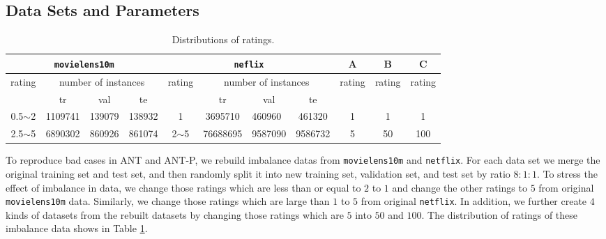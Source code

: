 \documentclass[11pt,twoside]{article}
\begin{document}
\subsection{Data Sets and Parameters}
\begin{table}[H]
\centering
\begin{tabular}{|c|c|l|c|c|c|l|c|c|c|c|}
\hline
\multicolumn{4}{|c|}{\tt movielens10m}                                    & \multicolumn{4}{c|}{\tt neflix}                                             & A                       & B                       & C                                            \\ \hline
\multirow{2}{*}{rating} & \multicolumn{3}{c|}{number of instances}    & \multirow{2}{*}{rating} & \multicolumn{3}{c|}{number of instances}      & \multirow{2}{*}{rating} & \multirow{2}{*}{rating} & \multicolumn{1}{l|}{\multirow{2}{*}{rating}} \\ \cline{2-4} \cline{6-8}
                        & tr      & \multicolumn{1}{c|}{val} & te     &                         & tr       & \multicolumn{1}{c|}{val} & te      &                         &                         & \multicolumn{1}{l|}{}                        \\ \hline
0.5$\sim$2              & 1109741 & 139079                   & 138932 & 1                       & 3695710  & 460960                   & 461320  & 1                       & 1                       & 1                                            \\ \hline
2.5$\sim$5              & 6890302 & 860926                   & 861074 & 2$\sim$5                & 76688695 & 9587090                  & 9586732 & 5                       & 50                      & 100                                          \\ \hline
\end{tabular}
\caption{Distributions of ratings.}
\label{tab:data_dist}
\end{table}
To reproduce bad cases in ANT and ANT-P, we rebuild imbalance datas from {\tt movielens10m} and {\tt netflix}. For each data set we merge the original training set and test set, and then randomly split it into new training set, validation set, and test set by ratio $8:1:1$. To stress the effect of imbalance in data, we change those ratings which are less than or equal to $2$ to $1$ and change the other ratings to $5$ from original {\tt movielens10m} data. Similarly, we change those ratings which are large than $1$ to $5$ from original {\tt netflix}. In addition, we further create $4$ kinds of datasets from the rebuilt datasets by changing those ratings which are $5$ into $50$ and $100$. The distribution of ratings of these imbalance data shows in Table \ref{tab:data_dist}.
\end{document}
